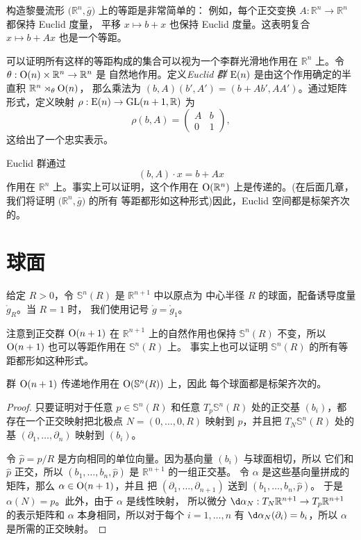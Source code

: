 构造黎曼流形 $\bigl(\mathbb{R}^n,\bar g \bigr)$ 上的等距是非常简单的：
例如，每个正交变换 $A:\mathbb{R}^n\to \mathbb{R}^n$ 都保持 Euclid 度量，
平移 $x\mapsto b+x$ 也保持 Euclid 度量。这表明复合 $x\mapsto b+Ax$
也是一个等距。

可以证明所有这样的等距构成的集合可以视为一个李群光滑地作用在 $\mathbb{R}^n$
上。令 $\theta:\operatorname{O}(n)\times \mathbb{R}^n\to \mathbb{R}^n$ 是
自然地作用。定义\emph{Euclid 群} $\operatorname{E}(n)$ 是由这个作用确定的半直积 $\mathbb{R}^n\rtimes_\theta \operatorname{O}(n)$，
那么乘法为 $(b,A)(b',A')=(b+A b',AA')$。通过矩阵形式，定义映射
$\rho:\operatorname{E}(n)\to \operatorname{GL}(n+1,\mathbb{R})$ 为
\[
  \rho(b,A)=\begin{pmatrix}
    A & b\\
    0 & 1
  \end{pmatrix},
\]
这给出了一个忠实表示。

Euclid 群通过
\begin{equation}
  (b,A)\cdot x=b+Ax
\end{equation}
作用在 $\mathbb{R}^n$ 上。事实上可以证明，这个作用在 $\operatorname{O}(\mathbb{R}^n)$
上是传递的。(在后面几章，我们将证明 $\bigl(\mathbb{R}^n,\bar g\bigr)$ 的所有 
等距都形如这种形式)因此，Euclid 空间都是标架齐次的。

\section{球面}

给定 $R>0$，令 $\mathbb{S}^n(R)$ 是 $\mathbb{R}^{n+1}$ 中以原点为
中心半径 $R$ 的球面，配备诱导度量 $\mathring g_R$。当 $R=1$ 时，
我们使用记号 $\mathring g=\mathring g_1$。

注意到正交群 $\operatorname{O}(n+1)$ 在 $\mathbb{R}^{n+1}$ 上的自然作用也保持
$\mathbb{S}^n(R)$ 不变，所以 $\operatorname{O}(n+1)$ 也可以等距作用在 $\mathbb{S}^n(R)$ 上。
事实上也可以证明 $\mathbb{S}^n(R)$ 的所有等距都形如这种形式。

\begin{proposition}
  群 $\operatorname{O}(n+1)$ 传递地作用在 $\operatorname{O}(\mathbb{S}^n(R))$ 上，因此
  每个球面都是标架齐次的。
\end{proposition}
\begin{proof}
  只要证明对于任意 $p\in \mathbb{S}^n(R)$ 和任意 $T_p \mathbb{S}^n(R)$
  处的正交基 $(b_i)$，都存在一个正交映射把北极点 $N=(0,\dots,0,R)$
  映射到 $p$，并且把 $T_N \mathbb{S}^n(R)$ 处的基 $(\partial_1,\dots,\partial_n)$ 
  映射到 $(b_i)$。

  令 $\hat p=p/R$ 是方向相同的单位向量。因为基向量 $(b_i)$ 与球面相切，所以
  它们和 $\hat p$ 正交，所以 $(b_1,\dots,b_n,\hat p)$ 是 $\mathbb{R}^{n+1}$ 的一组正交基。
  令 $\alpha$ 是这些基向量拼成的矩阵，那么 $\alpha\in \operatorname{O}(n+1)$，并且
  把 $(\partial_1,\dots,\partial_{n+1})$ 送到 $(b_1,\dots,b_n,\hat p)$。
  于是 $\alpha(N)=p$。此外，由于 $\alpha$ 是线性映射，
  所以微分 $\d\alpha_N:T_N \mathbb{R}^{n+1}\to T_{p} \mathbb{R}^{n+1}$
  的表示矩阵和 $\alpha$ 本身相同，所以对于每个 $i=1,\dots,n$ 有
  $\d\alpha_N(\partial_i)=b_i$，所以 $\alpha$ 是所需的正交映射。
\end{proof}

